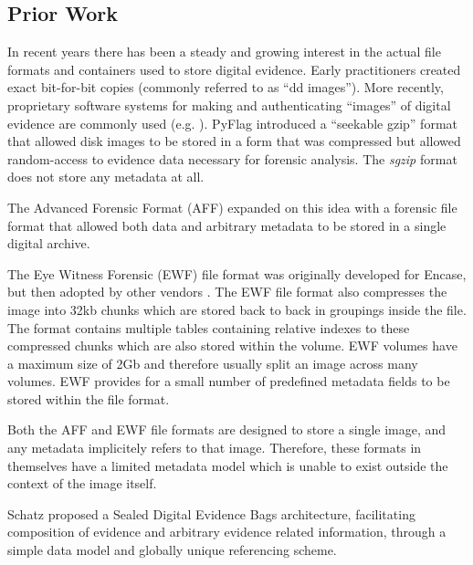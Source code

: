 \documentclass[10pt, conference]{IEEEtran}
\begin{document}
\subsection{Prior Work}
In recent years there has been a steady and growing interest in the
actual file formats and containers used to store digital
evidence. Early practitioners created exact bit-for-bit copies
(commonly referred to as ``dd images''). More recently, proprietary
software systems for making and authenticating ``images'' of digital
evidence are commonly used
(e.g. \cite{safeback,ilook,encase}). PyFlag\cite{pyflag} introduced a
``seekable gzip'' format that allowed disk images to be stored in a
form that was compressed but allowed random-access to evidence data
necessary for forensic analysis. The \emph{sgzip} format does not
store any metadata at all.

The Advanced Forensic Format (AFF) expanded on this idea with a
forensic file format that allowed both data and arbitrary metadata to
be stored in a single digital archive\cite{garfinkel:aff}. 

The Eye Witness Forensic (EWF) file format was originally developed
for Encase\cite{encase}, but then adopted by other vendors
\cite{libewf}. The EWF file format also compresses the image into 32kb
chunks which are stored back to back in groupings inside the file. The
format contains multiple tables containing relative indexes to these
compressed chunks which are also stored within the volume. EWF volumes
have a maximum size of 2Gb and therefore usually split an image across
many volumes. EWF provides for a small number of predefined metadata
fields to be stored within the file format.

Both the AFF and EWF file formats are designed to store a single
image, and any metadata implicitely refers to that image. Therefore,
these formats in themselves have a limited metadata model which is
unable to exist outside the context of the image itself.


Schatz proposed a Sealed Digital Evidence Bags architecture,
facilitating composition of evidence and arbitrary evidence related
information, through a simple data model and globally unique
referencing scheme\cite{schatz:sdeb}.
\end{document}
